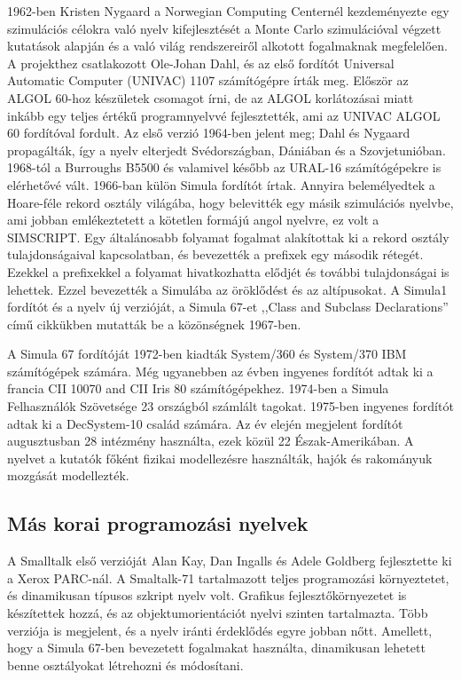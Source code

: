 \documentclass[a4paper,12pt,twoside]{report}
\theoremstyle{definition}
\begin{document}
	1962-ben Kristen Nygaard a Norwegian Computing Centernél kezdeményezte egy szimulációs célokra való nyelv kifejlesztését a Monte Carlo szimulációval végzett kutatások alapján és a való világ rendszereiről alkotott fogalmaknak megfelelően. A projekthez csatlakozott Ole-Johan Dahl, és az első fordítót Universal Automatic Computer (UNIVAC) 1107 számítógépre írták meg. Először az ALGOL 60-hoz készületek csomagot írni, de az ALGOL korlátozásai miatt inkább egy teljes értékű programnyelvvé fejlesztették, ami az UNIVAC ALGOL 60 fordítóval fordult. Az első verzió 1964-ben jelent meg; Dahl és Nygaard propagálták, így a nyelv elterjedt Svédországban, Dániában és a Szovjetunióban. 1968-tól a Burroughs B5500 és valamivel később az URAL-16 számítógépekre is elérhetővé vált. 1966-ban külön Simula fordítót írtak. Annyira belemélyedtek a Hoare-féle rekord osztály világába, hogy belevitték egy másik szimulációs nyelvbe, ami jobban emlékeztetett a kötetlen formájú angol nyelvre, ez volt a SIMSCRIPT. Egy általánosabb folyamat fogalmat alakítottak ki a rekord osztály tulajdonságaival kapcsolatban, és bevezették a prefixek egy második rétegét. Ezekkel a prefixekkel a folyamat hivatkozhatta elődjét és további tulajdonságai is lehettek. Ezzel bevezették a Simulába az öröklődést és az altípusokat. A Simula1 fordítót és a nyelv új verzióját, a Simula 67-et ,,Class and Subclass Declarations'' című cikkükben mutatták be a közönségnek 1967-ben.\cite{Holmevik}
	
	A Simula 67 fordítóját 1972-ben kiadták System/360 és System/370 IBM számítógépek számára. Még ugyanebben az évben ingyenes fordítót adtak ki a francia CII 10070 and CII Iris 80 számítógépekhez. 1974-ben a Simula Felhasználók Szövetsége 23 országból számlált tagokat. 1975-ben ingyenes fordítót adtak ki a DecSystem-10 család számára. Az év elején megjelent fordítót augusztusban 28 intézmény használta, ezek közül 22 Észak-Amerikában. A nyelvet a kutatók főként fizikai modellezésre használták, hajók és rakományuk mozgását modellezték.
	
	\subsection{Más korai programozási nyelvek}
	
	A Smalltalk első verzióját Alan Kay, Dan Ingalls és Adele Goldberg fejlesztette ki a Xerox PARC-nál. A Smaltalk-71 tartalmazott teljes programozási környeztetet, és dinamikusan típusos szkript nyelv volt. Grafikus fejlesztőkörnyezetet is készítettek hozzá, és az objektumorientációt nyelvi szinten tartalmazta. Több verziója is megjelent, és a nyelv iránti érdeklődés egyre jobban nőtt. Amellett, hogy a Simula 67-ben bevezetett fogalmakat használta, dinamikusan lehetett benne osztályokat létrehozni és módosítani.
	
\end{document}
